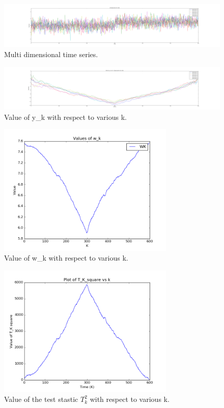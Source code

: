 \documentclass{article}
\begin{document}
\begin{figure}[ht!]
  \centering
  \includegraphics[width=1\textwidth]{images/rd_offline/ts}
  \caption{Multi dimensional time series.\label{fig:rd_ts}}
\end{figure}

\begin{figure}[ht!]
  \centering
  \includegraphics[width=1\textwidth]{images/rd_offline/y_k}
  \caption{Value of y\_k with respect to various k.\label{fig:rd_y_k}}
\end{figure}

\begin{figure}[ht!]
  \centering
  \includegraphics[width=0.75\textwidth]{images/rd_offline/w_k}
  \caption{Value of w\_k with respect to various k.\label{fig:rd_w_k}}
\end{figure}

\begin{figure}[ht!]
  \centering
  \includegraphics[width=0.75\textwidth]{images/rd_offline/tk_sq}
  \caption{Value of the test stastic $ T_{k}^{2} $ with respect to various k.\label{fig:rd_tk_sq}}
\end{figure}
\end{document}
